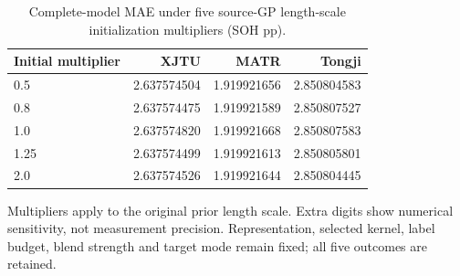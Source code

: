 \begin{table}[H]\centering
\caption{Complete-model MAE under five source-GP length-scale initialization multipliers (SOH pp).}\label{tab:sinit}
\papertablesize\setlength{\tabcolsep}{4pt}\renewcommand{\arraystretch}{1.15}
\begin{tabular}{lrrr}\toprule
Initial multiplier & XJTU & MATR & Tongji \\ \midrule
0.5 & 2.637574504 & 1.919921656 & 2.850804583 \\
0.8 & 2.637574475 & 1.919921589 & 2.850807527 \\
1.0 & 2.637574820 & 1.919921668 & 2.850807583 \\
1.25 & 2.637574499 & 1.919921613 & 2.850805801 \\
2.0 & 2.637574526 & 1.919921644 & 2.850804445 \\
\bottomrule\end{tabular}
\par\smallskip\begin{minipage}{\linewidth}\papertablesize Multipliers apply to the original prior length scale. Extra digits show numerical sensitivity, not measurement precision. Representation, selected kernel, label budget, blend strength and target mode remain fixed; all five outcomes are retained.\end{minipage}
\end{table}
